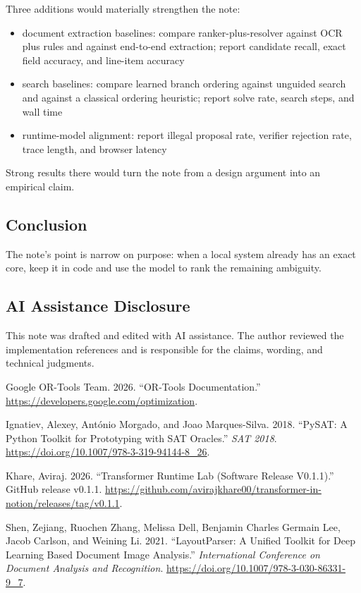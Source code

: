 \documentclass[
]{article}
\newlength{\cslhangindent}
\newenvironment{CSLReferences}[2] %
 {\begin{list}{}{%
  \setlength{\itemindent}{0pt}
  \setlength{\leftmargin}{0pt}
  \setlength{\parsep}{0pt}
  \ifodd #1
   \setlength{\leftmargin}{\cslhangindent}
   \setlength{\itemindent}{-1\cslhangindent}
  \fi
  \setlength{\itemsep}{#2\baselineskip}}}
 {\end{list}}
\providecommand{\tightlist}{%
  \setlength{\itemsep}{0pt}\setlength{\parskip}{0pt}}
\begin{document}
Three additions would materially strengthen the note:

\begin{itemize}
\tightlist
\item
  document extraction baselines: compare ranker-plus-resolver against
  OCR plus rules and against end-to-end extraction; report candidate
  recall, exact field accuracy, and line-item accuracy
\item
  search baselines: compare learned branch ordering against unguided
  search and against a classical ordering heuristic; report solve rate,
  search steps, and wall time
\item
  runtime-model alignment: report illegal proposal rate, verifier
  rejection rate, trace length, and browser latency
\end{itemize}

Strong results there would turn the note from a design argument into an
empirical claim.

\subsection{Conclusion}\label{conclusion}

The note's point is narrow on purpose: when a local system already has
an exact core, keep it in code and use the model to rank the remaining
ambiguity.

\subsection{AI Assistance Disclosure}\label{ai-assistance-disclosure}

This note was drafted and edited with AI assistance. The author reviewed
the implementation references and is responsible for the claims,
wording, and technical judgments.

\protect{}\label{refs}
\begin{CSLReferences}{1}{0}
Google OR-Tools Team. 2026. {``OR-Tools Documentation.''}
\url{https://developers.google.com/optimization}.

Ignatiev, Alexey, António Morgado, and Joao Marques-Silva. 2018.
{``PySAT: A Python Toolkit for Prototyping with SAT Oracles.''}
\emph{SAT 2018}. \url{https://doi.org/10.1007/978-3-319-94144-8_26}.

Khare, Aviraj. 2026. {``Transformer Runtime Lab (Software Release
V0.1.1).''} GitHub release v0.1.1.
\url{https://github.com/avirajkhare00/transformer-in-notion/releases/tag/v0.1.1}.

Shen, Zejiang, Ruochen Zhang, Melissa Dell, Benjamin Charles Germain
Lee, Jacob Carlson, and Weining Li. 2021. {``LayoutParser: A Unified
Toolkit for Deep Learning Based Document Image Analysis.''}
\emph{International Conference on Document Analysis and Recognition}.
\url{https://doi.org/10.1007/978-3-030-86331-9_7}.

\end{CSLReferences}
\end{document}

